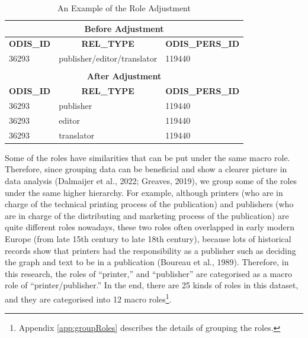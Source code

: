 \documentclass[12pt,a4paper,oneside]{book}
\begin{document}
\begin{sloppypar}
\begin{table}[H]
\centering
\caption{An Example of the Role Adjustment}
\label{tab:roleAdjust}
\begin{tabular}{lll}
\multicolumn{3}{c}{\textbf{Before Adjustment}}                                                                               \\ \hline
\multicolumn{1}{c}{\textbf{ODIS\_ID}} & \multicolumn{1}{c}{\textbf{REL\_TYPE}} & \multicolumn{1}{c}{\textbf{ODIS\_PERS\_ID}} \\ \hline
36293                                 & publisher/editor/translator            & 119440                                      \\
                                      &                                        &                                             \\
\multicolumn{3}{c}{\textbf{After Adjustment}}                                                                                \\ \hline
\multicolumn{1}{c}{\textbf{ODIS\_ID}} & \multicolumn{1}{c}{\textbf{REL\_TYPE}} & \multicolumn{1}{c}{\textbf{ODIS\_PERS\_ID}} \\ \hline
36293                                 & publisher                              & 119440                                      \\
36293                                 & editor                                 & 119440                                      \\
36293                                 & translator                             & 119440                                     
\end{tabular}
\end{table}

Some of the roles have similarities that can be put under the same macro role. Therefore, since grouping data can be beneficial and show a clearer picture in data analysis (Dalmaijer et al., 2022; Greaves, 2019), we group some of the roles under the same higher hierarchy. For example, although printers (who are in charge of the technical printing process of the publication) and publishers (who are in charge of the distributing and marketing process of the publication) are quite different roles nowadays, these two roles often overlapped in early modern Europe (from late 15th century to late 18th century), because lots of historical records show that printers had the responsibility as a publisher such as deciding the graph and text to be in a publication (Boureau et al., 1989). Therefore, in this research, the roles of “printer,” and “publisher” are categorised as a macro role of “printer/publisher.” In the end, there are 25 kinds of roles in this dataset, and they are categorised into 12 macro roles\footnote{Appendix \ref{app:groupRoles} describes the details of grouping the roles.}.


\end{sloppypar}
\end{document}

